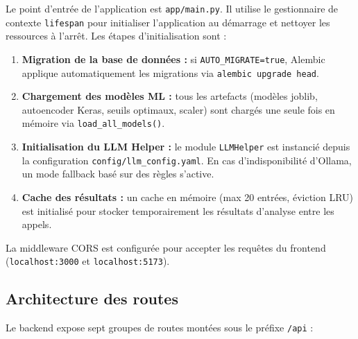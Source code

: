 \documentclass[12pt,a4paper,twoside]{report}
\begin{document}
Le point d'entrée de l'application est \texttt{app/main.py}. Il utilise le gestionnaire de contexte \texttt{lifespan} pour initialiser l'application au démarrage et nettoyer les ressources à l'arrêt. Les étapes d'initialisation sont :

\begin{enumerate}
  \item \textbf{Migration de la base de données :} si \texttt{AUTO\_MIGRATE=true}, Alembic applique automatiquement les migrations via \texttt{alembic upgrade head}.
  \item \textbf{Chargement des modèles ML :} tous les artefacts (modèles joblib, autoencoder Keras, seuils optimaux, scaler) sont chargés une seule fois en mémoire via \texttt{load\_all\_models()}.
  \item \textbf{Initialisation du LLM Helper :} le module \texttt{LLMHelper} est instancié depuis la configuration \texttt{config/llm\_config.yaml}. En cas d'indisponibilité d'Ollama, un mode fallback basé sur des règles s'active.
  \item \textbf{Cache des résultats :} un cache en mémoire (max 20 entrées, éviction LRU) est initialisé pour stocker temporairement les résultats d'analyse entre les appels.
\end{enumerate}

La middleware CORS est configurée pour accepter les requêtes du frontend (\texttt{localhost:3000} et \texttt{localhost:5173}).

\subsection{Architecture des routes}

Le backend expose sept groupes de routes montées sous le préfixe \texttt{/api} :
\end{document}
